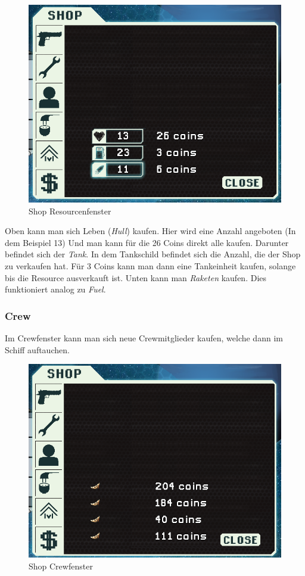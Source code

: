 \documentclass[fontsize=12pt,paper=a4,twoside]{scrartcl}
\begin{document}
\begin{figure}[H]
\centering
\includegraphics[width=1\linewidth]{DasSpiel/Shop/resourcen.png}
\caption{Shop Resourcenfenster}
\end{figure}

Oben kann man sich Leben (\textit{Hull}) kaufen. Hier wird eine Anzahl angeboten (In dem Beispiel 13) Und man kann für die 26 Coins direkt alle kaufen. Darunter befindet sich der \textit{Tank}. In dem Tankschild befindet sich die Anzahl, die der Shop zu verkaufen hat. Für 3 Coins kann man dann eine Tankeinheit kaufen, solange bis die Resource ausverkauft ist. Unten kann man \textit{Raketen} kaufen. Dies funktioniert analog zu \textit{Fuel}. 

\subsubsection{Crew}

Im Crewfenster kann man sich neue Crewmitglieder kaufen, welche dann im Schiff auftauchen. 

\begin{figure}[H]
\centering
\includegraphics[width=1\linewidth]{DasSpiel/Shop/crew.png}
\caption{Shop Crewfenster}
\end{figure}
\end{document}
